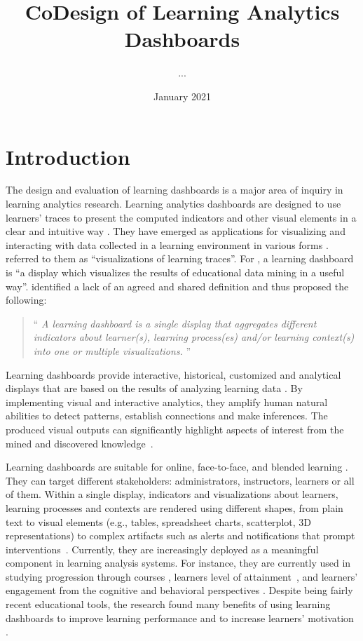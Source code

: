 \documentclass[preprint,12pt]{elsarticle}
\title{CoDesign of Learning Analytics Dashboards}
\author{...}
\date{January 2021}
\begin{document}
\maketitle

\section{Introduction} 
The design and evaluation of learning dashboards is a major area of inquiry in learning analytics research.
Learning analytics dashboards are designed to use learners' traces to present the computed indicators and other visual elements in a clear and intuitive way \citep{Brouns2015}.
They have emerged as applications for visualizing and interacting with data collected in a learning environment in various forms \citep{Ramos2015}. \citet{Steiner2014} referred to them as ``visualizations of learning traces''. For \citet{Yoo2015}, a learning dashboard is ``a display which visualizes the results of educational data mining in a useful way''. 
\citet{Schwendimann2017} identified a lack of an agreed and shared definition and thus proposed the following:
\begin{quotation}
	``\textit{%
		A learning dashboard is a single display that aggregates different indicators
		about learner(s), learning process(es) and/or learning context(s) into one or
		multiple visualizations.
	}'' \citep{Schwendimann2017}
\end{quotation}
Learning dashboards provide interactive, historical, customized and analytical displays that are based on the results of  analyzing learning data \citep{Park2015, Kim2015}. By implementing visual and interactive analytics, they amplify human natural abilities to detect patterns, establish connections and make inferences. The produced visual outputs can significantly highlight aspects of interest from the mined and discovered knowledge~\citep{Duval2011}. 

Learning dashboards are suitable for online,  face-to-face, and blended learning \citep{Verbert2013}. They can target different stakeholders: administrators, instructors, learners or all of them. 
Within a single display, indicators and visualizations about learners, learning processes and contexts are rendered using different shapes, from plain text to visual elements (e.g., tables, spreadsheet charts, scatterplot, 3D representations) to complex artifacts such as alerts and notifications that prompt interventions~\citep{Few2006, Podgorelec2011, Schwendimann2017}. 
Currently, they are increasingly deployed as a meaningful component in learning analysis systems. For instance, they are currently used in studying progression through courses \citep{Nicholson2012}, learners level of attainment~\citep{Gutierrez2012}, and learners' engagement from the cognitive and behavioral perspectives \citep{Carrillo2017}.
Despite being fairly recent educational tools, the research found many benefits of using learning dashboards to improve learning performance \citep{Arnold2012} and to increase learners' motivation    \citep{Verbert2013, Wise2016}.
\end{document}
